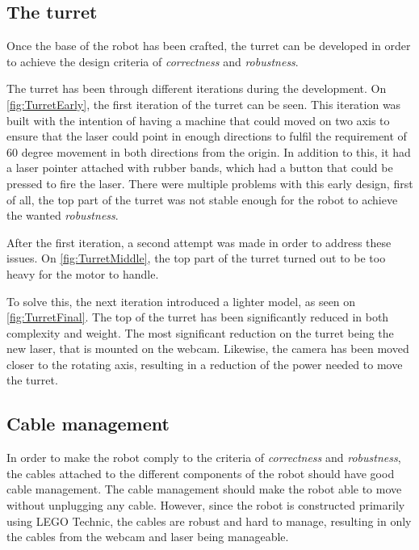 \subsection{The turret}
Once the base of the robot has been crafted, the turret can be developed in order to achieve the design criteria of \textit{correctness} and \textit{robustness}. 

The turret has been through different iterations during the development. 
On \autoref{fig:TurretEarly}, the first iteration of the turret can be seen.
This iteration was built with the intention of having a machine that could moved on two axis to ensure that the laser could point in enough directions to fulfil the requirement of 60 degree movement in both directions from the origin.
In addition to this, it had a laser pointer attached with rubber bands, which had a button that could be pressed to fire the laser.
There were multiple problems with this early design, first of all, the top part of the turret was not stable enough for the robot to achieve the wanted \textit{robustness}.

After the first iteration, a second attempt was made in order to address these issues. 
On \autoref{fig:TurretMiddle}, the top part of the turret turned out to be too heavy for the motor to handle. 

To solve this, the next iteration introduced a lighter model, as seen on \autoref{fig:TurretFinal}.
The top of the turret has been significantly reduced in both complexity and weight. 
The most significant reduction on the turret being the new laser, that is mounted on the webcam.
Likewise, the camera has been moved closer to the rotating axis, resulting in a reduction of the power needed to move the turret. 

\subsection{Cable management}
In order to make the robot comply to the criteria of \textit{correctness} and \textit{robustness}, the cables attached to the different components of the robot should have good cable management. 
The cable management should make the robot able to move without unplugging any cable.
However, since the robot is constructed primarily using LEGO Technic, the cables are robust and hard to manage, resulting in only the cables from the webcam and laser being manageable. 
